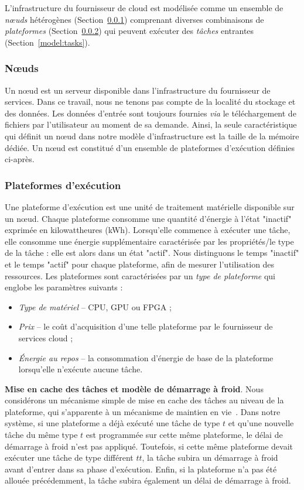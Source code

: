 L'infrastructure du fournisseur de cloud est modélisée comme un ensemble de \textit{nœuds} hétérogènes (Section~\ref{model:nodes}) comprenant diverses combinaisons de \textit{plateformes} (Section~\ref{model:platforms}) qui peuvent exécuter des \textit{tâches} entrantes (Section~\ref{model:tasks}). 

\subsubsection{Nœuds}
\label{model:nodes}
Un nœud est un serveur disponible dans l'infrastructure du fournisseur de services. Dans ce travail, nous ne tenons pas compte de la localité du stockage et des données. Les données d'entrée sont toujours fournies \textit{via} le téléchargement de fichiers par l'utilisateur au moment de sa demande.
Ainsi, la seule caractéristique qui définit un nœud dans notre modèle d'infrastructure est la taille de la mémoire dédiée. Un nœud est constitué d'un ensemble de plateformes d'exécution définies ci-après.

\subsubsection{Plateformes d'exécution}
\label{model:platforms}

Une plateforme d'exécution est une unité de traitement matérielle disponible sur un nœud. Chaque plateforme consomme une quantité d'énergie à l'état "inactif" exprimée en kilowattheures (kWh). Lorsqu'elle commence à exécuter une tâche, elle consomme une énergie supplémentaire caractérisée par les propriétés/le type de la tâche : elle est alors dans un état "actif". Nous distinguons le temps "inactif" et le temps "actif" pour chaque plateforme, afin de mesurer l'utilisation des ressources.
Les plateformes sont caractérisées par un \textit{type de plateforme} qui englobe les paramètres suivants :

\begin{itemize}
    \item \textit{Type de matériel} -- CPU, GPU ou FPGA ;
    \item \textit{Prix} -- le coût d'acquisition d'une telle plateforme par le fournisseur de services cloud ;
    \item \textit{Énergie au repos} -- la consommation d'énergie de base de la plateforme lorsqu'elle n'exécute aucune tâche.
\end{itemize}

\textbf{Mise en cache des tâches et modèle de démarrage à froid}. Nous considérons un mécanisme simple de mise en cache des tâches au niveau de la plateforme, qui s'apparente à un mécanisme de maintien en vie~\cite{7279063}. Dans notre système, si une plateforme a déjà exécuté une tâche de type $t$ et qu'une nouvelle tâche du même type $t$ est programmée sur cette même plateforme, le délai de démarrage à froid n'est pas appliqué. Toutefois, si cette même plateforme devait exécuter une tâche de type différent $tt$, la tâche subira un démarrage à froid avant d'entrer dans sa phase d'exécution. Enfin, si la plateforme n'a pas été allouée précédemment, la tâche subira également un délai de démarrage à froid.

